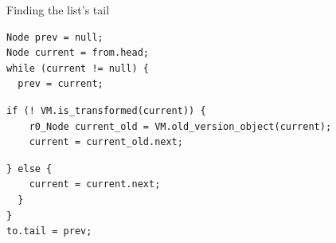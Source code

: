 \begin{frame}[fragile]{Finding the list's tail}%
\begin{minipage}{0.95\textwidth}
\begin{lstlisting}[numbers=none,basicstyle=\footnotesize\ttfamily]
Node prev = null;
Node current = from.head;
while (current != null) {
  prev = current;
\end{lstlisting}\vspace{-2ex}
\begin{lstlisting}[numbers=none,basicstyle=\footnotesize\ttfamily,backgroundcolor=\color{yellow}]
  if (! VM.is_transformed(current)) {
    r0_Node current_old = VM.old_version_object(current);
    current = current_old.next;
\end{lstlisting}\vspace{-2ex}
\begin{lstlisting}[numbers=none,basicstyle=\footnotesize\ttfamily]
  } else {
    current = current.next;
  }
}
to.tail = prev;
\end{lstlisting}
\end{minipage}
\end{frame}

